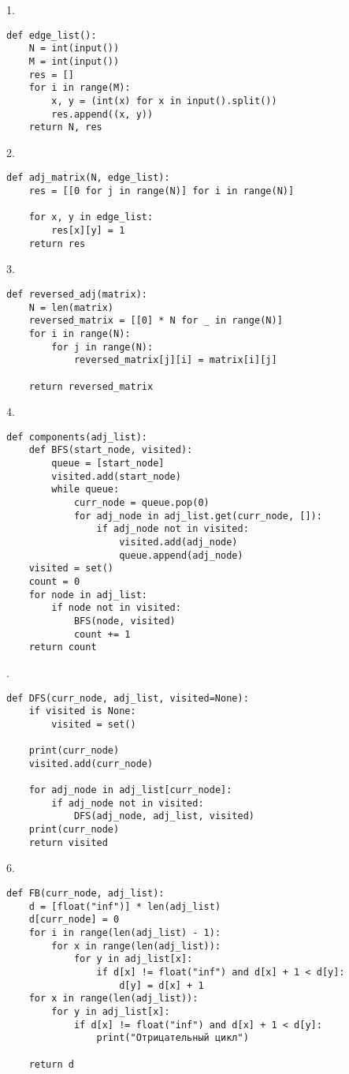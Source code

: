 \documentclass[a4paper, 14pt]{article}
\begin{document}
1.\begin{verbatim}
def edge_list():
    N = int(input())
    M = int(input())
    res = []
    for i in range(M):
        x, y = (int(x) for x in input().split())
        res.append((x, y))
    return N, res
\end{verbatim}
2. \begin{verbatim}
def adj_matrix(N, edge_list):
    res = [[0 for j in range(N)] for i in range(N)]

    for x, y in edge_list:
        res[x][y] = 1
    return res
\end{verbatim}
3. \begin{verbatim}
def reversed_adj(matrix):
    N = len(matrix)
    reversed_matrix = [[0] * N for _ in range(N)]
    for i in range(N):
        for j in range(N):
            reversed_matrix[j][i] = matrix[i][j]

    return reversed_matrix
\end{verbatim}
4.\begin{verbatim}
def components(adj_list):
    def BFS(start_node, visited):
        queue = [start_node]
        visited.add(start_node)
        while queue:
            curr_node = queue.pop(0)
            for adj_node in adj_list.get(curr_node, []):
                if adj_node not in visited:
                    visited.add(adj_node)
                    queue.append(adj_node)
    visited = set()
    count = 0
    for node in adj_list:
        if node not in visited:
            BFS(node, visited)
            count += 1
    return count
\end{verbatim}
.\begin{verbatim}
def DFS(curr_node, adj_list, visited=None):
    if visited is None:
        visited = set()

    print(curr_node)
    visited.add(curr_node)

    for adj_node in adj_list[curr_node]:
        if adj_node not in visited:
            DFS(adj_node, adj_list, visited)
    print(curr_node)
    return visited
\end{verbatim}
6.\begin{verbatim}
def FB(curr_node, adj_list):
    d = [float("inf")] * len(adj_list)
    d[curr_node] = 0
    for i in range(len(adj_list) - 1):
        for x in range(len(adj_list)):
            for y in adj_list[x]:
                if d[x] != float("inf") and d[x] + 1 < d[y]:
                    d[y] = d[x] + 1
    for x in range(len(adj_list)):
        for y in adj_list[x]:
            if d[x] != float("inf") and d[x] + 1 < d[y]:
                print("Отрицательный цикл")

    return d
\end{verbatim}
\end{document}
